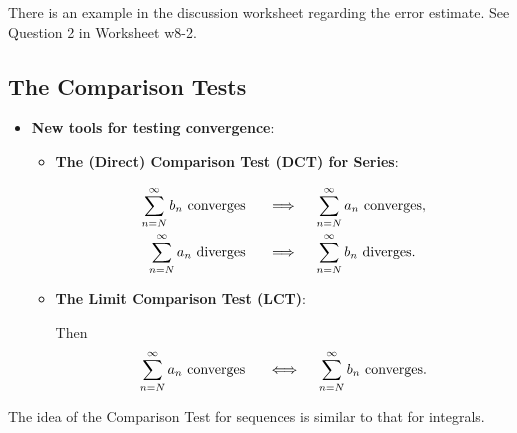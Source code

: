 \begin{ex}
    There is an example in the discussion worksheet regarding the error estimate. See Question 2 in Worksheet w8-2.
\end{ex}



\subsection{The Comparison Tests}  
\begin{center}
\begin{tcolorbox}
    \begin{itemize}
        \item \textbf{New tools for testing convergence}: 
        \begin{itemize}
            \item \textbf{The (Direct) Comparison Test (DCT) for Series}: 
            \begin{align*}
                \displaystyle\sum_{n=N}^\infty b_n \text{ converges } \quad &\implies  \quad \displaystyle\sum_{n=N}^\infty a_n \text{ converges}, \\
                \displaystyle\sum_{n=N}^\infty a_n \text{ diverges } \quad &\implies  \quad \displaystyle\sum_{n=N}^\infty b_n \text{ diverges}.
            \end{align*}
            \item \textbf{The Limit Comparison Test (LCT)}: 
            Then 
            \[\displaystyle\sum_{n=N}^\infty a_n \text{ converges } \quad \iff \quad \displaystyle\sum_{n=N}^\infty b_n \text{ converges}.\]
        \end{itemize}
    \end{itemize}
\end{tcolorbox}
\end{center}
The idea of the Comparison Test for sequences is similar to that for integrals.

